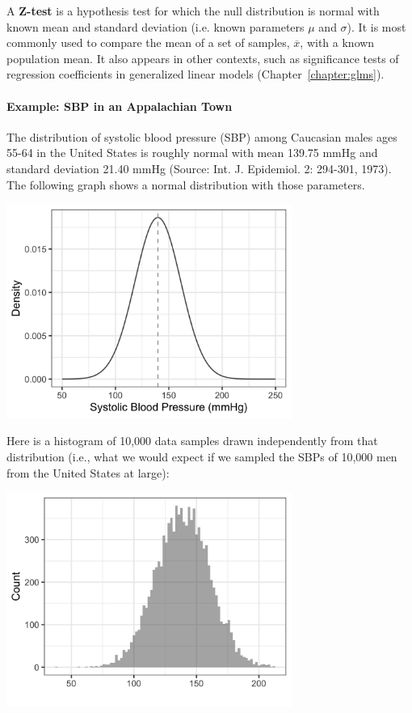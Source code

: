 A \textbf{Z-test} is a hypothesis test for which the null distribution is normal with known mean and standard deviation (i.e. known parameters $\mu$ and $\sigma$). It is most commonly used to compare the mean of a set of samples, $\overline{x}$, with a known population mean. It also appears in other contexts, such as significance tests of regression coefficients in generalized linear models (Chapter~\ref{chapter:glms}). 

\paragraph{Example: SBP in an Appalachian Town} The distribution of systolic blood pressure (SBP) among Caucasian males ages 55-64 in the United States is roughly normal with mean 139.75 mmHg and standard deviation 21.40 mmHg (Source: Int. J. Epidemiol. 2: 294-301, 1973). The following graph shows a normal distribution with those parameters.

\begin{center}
\includegraphics[width=0.7\textwidth]{img/hyp-z-test-example-00.png}
\end{center}

Here is a histogram of 10,000 data samples drawn independently from that distribution (i.e., what we would expect if we sampled the SBPs of 10,000 men from the United States at large):

\begin{center}
\includegraphics[width=0.7\textwidth]{img/hyp-z-test-example-0.png}
\end{center}

